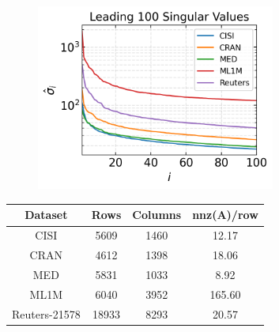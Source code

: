 \begin{figure}[h]
  \centering
  \includegraphics[width=0.7\textwidth]{../openreview/figures/sv_100_profile.png}
  \label{fig:sv}
\end{figure}

\begin{table}[h]
  \centering
  \begin{tabular}{cccc}
    \toprule
    Dataset       & Rows  & Columns & nnz(A)/row \\
    \midrule
    CISI \cite{LSISite}                                     & 5609  &    1460 &      12.17 \\
    CRAN \cite{LSISite}                                     & 4612  &    1398 &      18.06 \\
    MED  \cite{LSISite}                                     & 5831  &    1033 &       8.92 \\
    ML1M \cite{Harper2015}                                  & 6040  &    3952 &     165.60 \\
    Reuters-21578 \cite{Cai2005, Cai2007, Cai2008, Cai2009} & 18933 &    8293 &      20.57 \\
    \bottomrule
  \end{tabular}
  \label{table:datasets}
\end{table}
